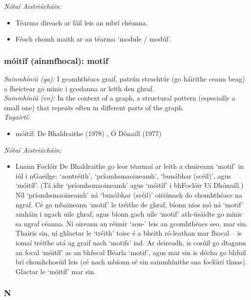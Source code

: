  \noindent \textit{Nótaí Aistriúcháin:}
\begin{itemize}
	\item Téarma díreach ar fáil leis an mbrí chéanna.
	\item Féach chomh maith ar an téarma `module / modúl'.
\end{itemize}


\subsubsection*{móitíf (ainmfhocal): motif}
 \noindent \textit{Sainmhíniú (ga):} I gcomhthéacs graif, patrún struchtúr (go háirithe ceann beag) a fheictear go minic i gcodanna ar leith den ghraf.
\\
 \noindent \textit{Sainmhíniú (en):} In the context of a graph, a structural pattern (especially a small one) that repeats often in different parts of the graph.
\\
 \noindent \textit{Tagairtí:}
\begin{itemize}
	\item móitíf: De Bhaldraithe (1978) \cite{de-bhaldraithe}, Ó Dónaill (1977) \cite{odonaill}
\end{itemize}

 \noindent \textit{Nótaí Aistriúcháin:}
\begin{itemize}
	\item Luann Foclóir De Bhaldraithe go leor téarmaí ar leith a chuireann `motif' in iúl i nGaeilge: `aontréith', `príomhsmaoineamh', `bunábhar (scéil)', agus `móitíf'. (Tá idir `príomhsmaoineamh' agus `móitíf' i bhFoclóir Uí Dhónaill.) Níl `príomhsmaoineamh' ná `bunábhar (scéil)' oiriúnach do chomhthéacs na ngraf. Cé go mbaineann `motif' le tréithe de ghraf, bíonn níos mó ná `motif' amháin i ngach uile ghraf, agus bíonn gach uile `motif' ath-úsáidte go minic sa ngraf céanna. Ní oireann an réimír `aon-' leis an gcomhthéacs seo, mar sin. Thairis sin, ní ghlactar le `tréith' toisc é a bheith ró-leathan mar fhocal -- is iomaí tréithe atá ag graif nach `motifs' iad. Ar deireadh, is cosúil go dtagann an focal `móitíf' as an bhfocal Béarla `motif', agus mar sin is dócha go bhfuil brí chomhchosúil leis (cé nach mbíonn sé sin sainmhínithe sna foclóirí thuas). Glactar le `móitíf' mar sin.
\end{itemize}


 \subsubsection*{N}

